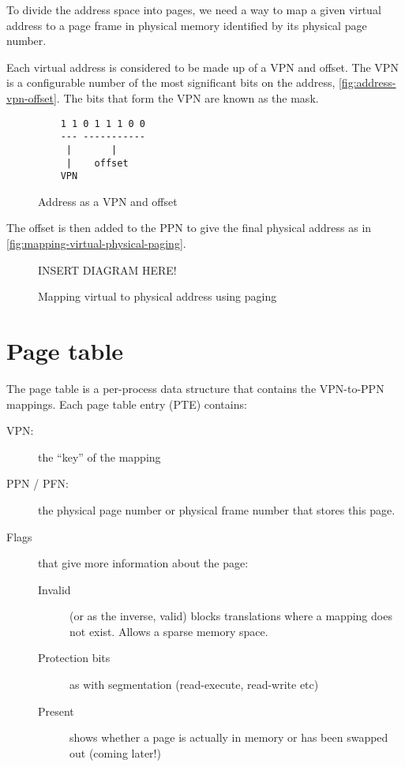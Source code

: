 To divide the address space into pages, we need a way to map a given virtual address to a page frame in physical memory identified by its physical page number.

Each virtual address is considered to be made up of a VPN and offset.
The VPN is a configurable number of the most significant bits on the address, \autoref{fig:address-vpn-offset}.
The bits that form the VPN are known as the mask.

\begin{figure}[htbp]
  \centering
\begin{verbatim}
    1 1 0 1 1 1 0 0
    --- -----------
     |       |
     |    offset
    VPN
\end{verbatim}
  \caption{Address as a VPN and offset}
  \label{fig:address-vpn-offset}
\end{figure}

The offset is then added to the PPN to give the final physical address as in \autoref{fig:mapping-virtual-physical-paging}. 

\begin{figure}[htbp]
  \centering
  INSERT DIAGRAM HERE!
  \caption{Mapping virtual to physical address using paging}
  \label{fig:mapping-virtual-physical-paging}
\end{figure}

\section{Page table}

The page table is a per-process data structure that contains the VPN-to-PPN mappings. Each page table entry (PTE) contains:

\begin{description}
\item[VPN:] the ``key'' of the mapping
\item[PPN / PFN:] the physical page number or physical frame number that stores this page.
\item[Flags] that give more information about the page: 
  \begin{description}
  \item[Invalid] (or as the inverse, valid) blocks translations where a mapping does not exist. Allows a sparse memory space.
  \item[Protection bits] as with segmentation (read-execute, read-write etc)
  \item[Present] shows whether a page is actually in memory or has been swapped out (coming later!)
  \end{description}
\end{description}

